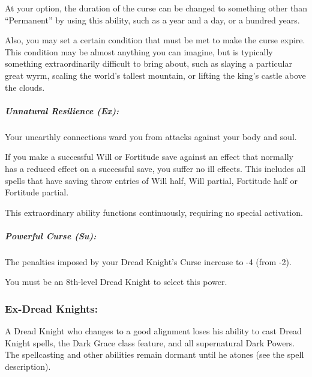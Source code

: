 At your option, the duration of the curse can be changed to something other than ``Permanent'' by using this ability, such as a year and a day, or a hundred years.

Also, you may set a certain condition that must be met to make the curse expire. This condition may be almost anything you can imagine, but is typically something extraordinarily difficult to bring about, such as slaying a particular great wyrm, scaling the world's tallest mountain, or lifting the king's castle above the clouds.

\subparagraph{Unnatural Resilience (Ex):}  
Your unearthly connections ward you from attacks against your body and soul. 

If you make a successful Will or Fortitude save against an effect that normally has a reduced effect on a successful save, you suffer no ill effects. This includes all spells that have saving throw entries of Will half, Will partial, Fortitude half or Fortitude partial.

This extraordinary ability functions continuously, requiring no special activation.

\subparagraph[Powerful Curse]{Powerful Curse (Su):}
\label{sec:PowerfulCurse}
The penalties imposed by your Dread Knight's Curse increase to -4 (from -2).

You must be an 8th-level Dread Knight to select this power.

\subsubsection{Ex-Dread Knights:}
A Dread Knight who changes to a good alignment loses his ability to cast Dread Knight spells, the Dark Grace class feature, and all supernatural Dark Powers.
The spellcasting and other abilities remain dormant until he atones (see the  spell description).


